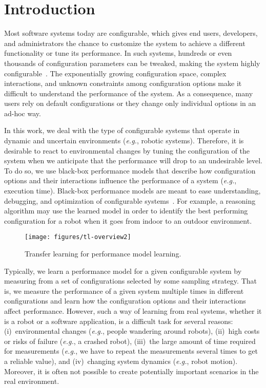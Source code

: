 \section{Introduction}
\label{sec:introduction}

Most software systems today are configurable, which gives end users, developers, and administrators the chance to customize the system to achieve a different functionality or tune its performance. In such systems, hundreds or even thousands of configuration parameters can be tweaked, making the system highly configurable~\cite{influence}. The exponentially growing configuration space, complex interactions, and unknown constraints among configuration options make it difficult to understand the performance of the system. As a consequence, many users rely on default configurations or they change only individual options in an ad-hoc way.

In this work, we deal with the type of configurable systems that operate in dynamic and uncertain environments (\emph{e.g.}, robotic systems). Therefore, it is desirable to react to environmental changes by tuning the configuration of the system when we anticipate that the performance will drop to an undesirable level. To do so, we use black-box performance models that describe how configuration options and their interactions influence the performance of a system (\emph{e.g.}, execution time). Black-box performance models are meant to ease understanding, debugging, and optimization of configurable systems~\cite{influence}. For example, a reasoning algorithm may use the learned model in order to identify the best performing configuration for a robot when it goes from indoor to an outdoor environment. %

\begin{figure}[t]
	\begin{center}
		\texttt{[image: figures/tl-overview2]}
		\caption{Transfer learning for performance model learning.}
		\label{fig:overview}
	\end{center}
\end{figure}

Typically, we learn a performance model for a given configurable system by measuring from a set of configurations selected by some sampling strategy. That is, we measure the performance of a given system multiple times in different configurations and learn how the configuration options and their interactions affect performance. However, such a way of learning from real systems, whether it is a robot or a software application, is a difficult task for several reasons: (i)~environmental changes (\emph{e.g.}, people wandering around robots), (ii)~high costs or risks of failure (\emph{e.g.}, a crashed robot), (iii)~the large amount of time required for measurements (\emph{e.g.}, we have to repeat the measurements several times to get a reliable value), and (iv)~changing system dynamics (\emph{e.g.}, robot motion). Moreover, it is often not possible to create potentially important scenarios in the real environment.

